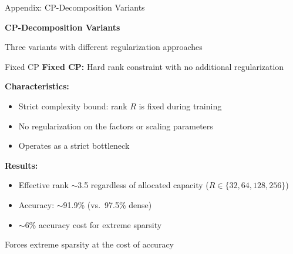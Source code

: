 
\begin{frame}{Appendix: CP-Decomposition Variants}
    \begin{center}
        \Large
        \textbf{CP-Decomposition Variants}
        
        \vspace{0.5cm}
        \normalsize
        Three variants with different regularization approaches
    \end{center}
\end{frame}

\begin{frame}{Fixed CP}
    \textbf{Fixed CP:} Hard rank constraint with no additional regularization
    
    \vspace{0.5cm}
    \textbf{Characteristics:}
    \begin{itemize}
        \item Strict complexity bound: rank $R$ is fixed during training
        \item No regularization on the factors or scaling parameters
        \item Operates as a strict bottleneck
    \end{itemize}
    
    \vspace{0.5cm}
    \textbf{Results:}
    \begin{itemize}
        \item Effective rank $\sim$3.5 regardless of allocated capacity ($R \in \{32, 64, 128, 256\}$)
        \item Accuracy: $\sim$91.9\% (vs.\ 97.5\% dense)
        \item $\sim$6\% accuracy cost for extreme sparsity
    \end{itemize}
    
    \vspace{0.3cm}
    \small
    Forces extreme sparsity at the cost of accuracy
\end{frame}

